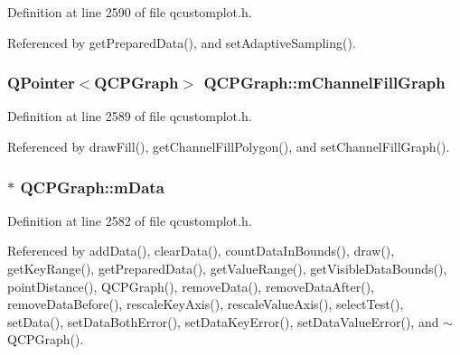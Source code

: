 Definition at line 2590 of file qcustomplot.\+h.



Referenced by get\+Prepared\+Data(), and set\+Adaptive\+Sampling().

\hypertarget{class_q_c_p_graph_a2f1777c7accf8244fc640c33f0b04577}{}
\subsubsection[{m\+Channel\+Fill\+Graph}]{\setlength{\rightskip}{0pt plus 5cm}Q\+Pointer$<${\bf Q\+C\+P\+Graph}$>$ Q\+C\+P\+Graph\+::m\+Channel\+Fill\+Graph\hspace{0.3cm}{\ttfamily [protected]}}\label{class_q_c_p_graph_a2f1777c7accf8244fc640c33f0b04577}


Definition at line 2589 of file qcustomplot.\+h.



Referenced by draw\+Fill(), get\+Channel\+Fill\+Polygon(), and set\+Channel\+Fill\+Graph().

\hypertarget{class_q_c_p_graph_a8457c840f69a0ac49f61d30a509c5d08}{}
\subsubsection[{m\+Data}]{$\ast$ Q\+C\+P\+Graph\+::m\+Data\hspace{0.3cm}{\ttfamily [protected]}}\label{class_q_c_p_graph_a8457c840f69a0ac49f61d30a509c5d08}


Definition at line 2582 of file qcustomplot.\+h.



Referenced by add\+Data(), clear\+Data(), count\+Data\+In\+Bounds(), draw(), get\+Key\+Range(), get\+Prepared\+Data(), get\+Value\+Range(), get\+Visible\+Data\+Bounds(), point\+Distance(), Q\+C\+P\+Graph(), remove\+Data(), remove\+Data\+After(), remove\+Data\+Before(), rescale\+Key\+Axis(), rescale\+Value\+Axis(), select\+Test(), set\+Data(), set\+Data\+Both\+Error(), set\+Data\+Key\+Error(), set\+Data\+Value\+Error(), and $\sim$\+Q\+C\+P\+Graph().

\hypertarget{class_q_c_p_graph_a7b51c8d09510f9d195b5e765ccbcf05b}{}
